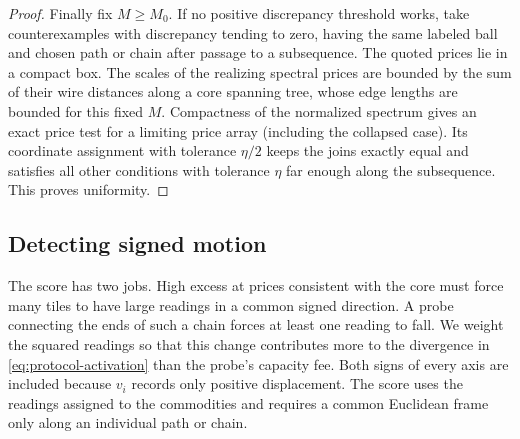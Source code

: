 \begin{proof}
Finally fix $M\ge M_0$. If no positive discrepancy threshold works,
take counterexamples with discrepancy tending to zero, having the
same labeled ball and chosen path or chain after passage to a
subsequence. The quoted prices lie in a compact box. The scales of
the realizing spectral prices are bounded by the sum of their wire
distances along a core spanning tree, whose edge lengths are bounded
for this fixed $M$. Compactness of the normalized spectrum gives an
exact price test for a limiting price array (including the collapsed
case). Its coordinate assignment with tolerance $\eta/2$ keeps the
joins exactly equal and satisfies all other conditions with tolerance
$\eta$ far enough along the subsequence. This proves uniformity.
\end{proof}

\subsection{Detecting signed motion}

The score has two jobs. High excess at prices consistent with the core
must force many tiles to have large readings in a common signed
direction. A probe connecting the ends of such a chain forces at least
one reading to fall. We weight the squared readings so that this change
contributes more to the divergence in \eqref{eq:protocol-activation}
than the probe's capacity fee. Both signs of every axis are included
because $v_i$ records only positive displacement. The score uses the
readings assigned to the commodities and requires a common Euclidean
frame only along an individual path or chain.

